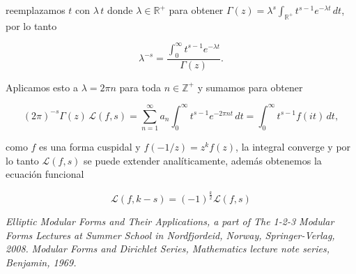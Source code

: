 \documentclass[letterpaper]{article}
\newcommand{\zah}{\ensuremath{ \mathbb Z }}
\newcommand{\ga}{\ensuremath{\Gamma}}
\newcommand{\re}{\ensuremath{\mathbb R }}
\begin{document}
\noindent reemplazamos $t$ con $\lambda\,t$ donde $\lambda\in\re^{+}$ para obtener $\ga(z)=\lambda^{s}\int_{\re^{+}}t^{s-1}e^{-\lambda t}\,dt$, por lo tanto

$$\lambda^{-s}=\frac{\int_0^{\infty}t^{s-1}e^{-\lambda t}}{\ga(z)}.$$

Aplicamos esto a $\lambda = 2\pi n$ para toda $n\in\zah^{+}$ y sumamos para obtener

\begin{equation}
(2\pi)^{-s}\ga(z)\,\mathcal{L}(f,s)=
\sum_{n=1}^{\infty}a_n\int_0^{\infty}t^{s-1}e^{-2\pi nt}\,dt=
\int_0^{\infty}t^{s-1}f(it)\,dt,
\end{equation}

\noindent como $f$ es una forma cuspidal y $f(-1/z)=z^k f(z)$, la integral converge y por lo tanto $\mathcal{L}(f,s)$ se puede extender analíticamente, además obtenemos la ecuación funcional

\begin{equation}
\mathcal{L}(f,k-s)=(-1)^{\frac{k}{2}}\mathcal{L}(f,s)
\end{equation}

\begin{thebibliography}{99}

 {\it Elliptic Modular Forms and Their Applications, a part of The 1-2-3 Modular Forms Lectures at Summer School in Nordfjordeid, Norway, Springer-Verlag, 2008.}
 {\it Modular Forms and Dirichlet Series, Mathematics lecture note series, Benjamin,
1969.}

\end{thebibliography}
\end{document}
